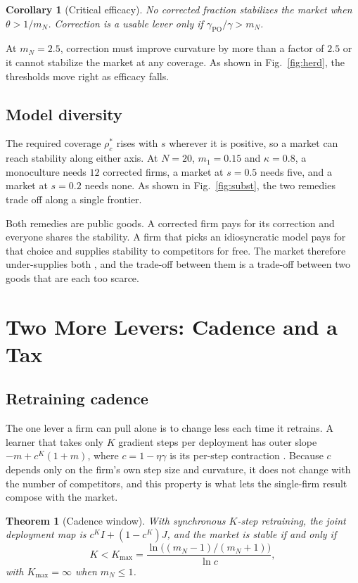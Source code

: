 \documentclass[conference]{IEEEtran}
\newtheorem{theorem}{Theorem}
\newtheorem{corollary}{Corollary}
\theoremstyle{definition}
\newcommand{\gPO}{\gamma_{\mathrm{PO}}}
\begin{document}
\begin{corollary}[Critical efficacy]\label{cor:efficacy}
No corrected fraction stabilizes the market when $\theta > 1/m_N$. Correction
is a usable lever only if $\gPO/\gamma > m_N$.
\end{corollary}

At $m_N = 2.5$, correction must improve curvature by more than a factor of
$2.5$ or it cannot stabilize the market at any coverage. As shown in
Fig.~\ref{fig:herd}, the thresholds move right as efficacy falls.

\subsection{Model diversity}
The required coverage $\rho_c^{*}$ rises with $s$ wherever it is positive, so
a market can reach stability along either axis. At $N = 20$, $m_1 = 0.15$ and
$\kappa = 0.8$, a monoculture needs $12$ corrected firms, a market at
$s = 0.5$ needs five, and a market at $s = 0.2$ needs none. As shown in
Fig.~\ref{fig:subst}, the two remedies trade off along a single frontier.

Both remedies are public goods. A corrected firm pays for its correction and
everyone shares the stability. A firm that picks an idiosyncratic model pays
for that choice and supplies stability to competitors for free. The market
therefore under-supplies both \cite{bergstrom1986}, and the trade-off between
them is a trade-off between two goods that are each too scarce.

\section{Two More Levers: Cadence and a Tax}\label{sec:levers}

\subsection{Retraining cadence}
The one lever a firm can pull alone is to change less each time it retrains. A
learner that takes only $K$ gradient steps per deployment has outer slope
$-m + c^{K}(1+m)$, where $c = 1 - \eta\gamma$ is its per-step contraction
\cite{mendler2020}. Because $c$ depends only on the firm's own step size and
curvature, it does not change with the number of competitors, and this
property is what lets the single-firm result compose with the market.

\begin{theorem}[Cadence window]\label{thm:cadence}
With synchronous $K$-step retraining, the joint deployment map is
$c^{K}I + (1 - c^{K})J$, and the market is stable if and only if
\begin{equation}
  K < K_{\max} = \frac{\ln\bigl((m_N - 1)/(m_N + 1)\bigr)}{\ln c},
  \label{eq:kmax}
\end{equation}
with $K_{\max} = \infty$ when $m_N \le 1$.
\end{theorem}
\end{document}
